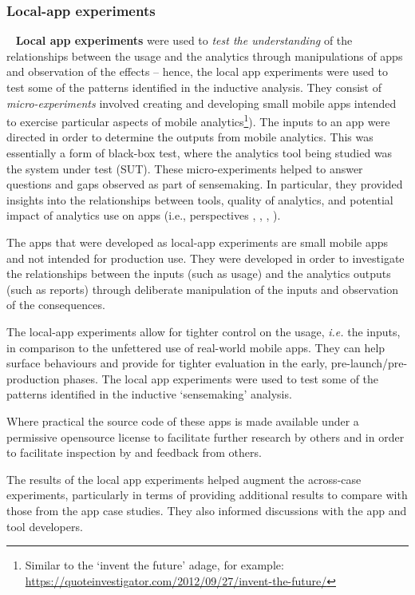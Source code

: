 \subsubsection{Local-app experiments}~\label{local-app-experiments-research-method} 
\textbf{Local app experiments} were used to \textit{test the understanding} of the relationships between the usage and the analytics through manipulations of apps and observation of the effects -- hence, the local app experiments were used to test some of the patterns identified in the inductive analysis. They consist of \textit{micro-experiments} involved creating and developing small mobile apps intended to exercise particular aspects of mobile analytics\footnote{Similar to the `invent the future' adage, for example: \url{https://quoteinvestigator.com/2012/09/27/invent-the-future/}}). The inputs to an app were directed in order to determine the outputs from mobile analytics. This was essentially a form of black-box test, where the analytics tool being studied was the system under test (SUT). These micro-experiments helped to answer questions and gaps observed as part of sensemaking.  In particular, they provided insights into the relationships between tools, quality of analytics, and potential impact of analytics use on apps (i.e., perspectives \uartefacts, \utools, \iartefacts, \itools). 

The apps that were developed as local-app experiments are small mobile apps and not intended for production use. They were developed in order to investigate the relationships between the inputs (such as usage) and the analytics outputs (such as reports) through deliberate manipulation of the inputs and observation of the consequences.  

The local-app experiments allow for tighter control on the usage, \textit{i.e.} the inputs, in comparison to the unfettered use of real-world mobile apps. They can help surface behaviours and provide for tighter evaluation in the early, pre-launch/pre-production phases. %
The local app experiments were used to test some of the patterns identified in the inductive `sensemaking' analysis.

Where practical the source code of these apps is made available under a permissive opensource license to facilitate further research by others and in order to facilitate inspection by and feedback from others.

The results of the local app experiments helped augment the across-case experiments, particularly in terms of providing additional results to compare with those from the app case studies. They also informed discussions with the app and tool developers. 

